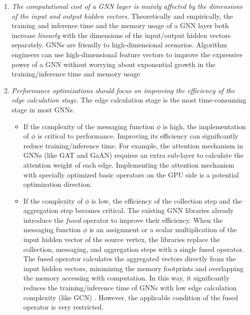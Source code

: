 \begin{enumerate}
    \item \emph{The computational cost of a GNN layer is mainly affected by the dimensions of the input and output hidden vectors.}
          Theoretically and empirically, the training and inference time and the memory usage of a GNN layer both increase \emph{linearly} with the dimensions of the input/output hidden vectors separately.
          GNNs are friendly to high-dimensional scenarios. 
          Algorithm engineers can use high-dimensional feature vectors to improve the expressive power of a GNN without worrying about exponential growth in the training/inference time and memory usage
    \item \emph{Performance optimizations should focus on improving the efficiency of the edge calculation stage.}
          The edge calculation stage is the most time-consuming stage in most GNNs.
          \begin{itemize}
              \item If the complexity of the messaging function $\phi$ is high, the implementation of $\phi$ is critical to performance.
                    Improving its efficiency can significantly reduce training/inference time.
                    For example, the attention mechanism in GNNs (like GAT and GaAN) requires an extra sub-layer to calculate the attention weight of each edge.
                    Implementing the attention mechanism with specially optimized basic operators on the GPU side is a potential optimization direction.
              \item If the complexity of $\phi$ is low, the efficiency of the collection step and the aggregation step becomes critical.
                    The existing GNN libraries \cite{DGL, PyG, ma2019_neugraph} already introduce the \emph{fused} operator to improve their efficiency.
                    When the messaging function $\phi$ is an assignment or a scalar multiplication of the input hidden vector of the source vertex, the libraries replace the collection, messaging, and aggregation steps with a single fused operator.
                    The fused operator calculates the aggregated vectors directly from the input hidden vectors, minimizing the memory footprints and overlapping the memory accessing with computation.
                    In this way, it significantly reduces the training/inference time of GNNs with low edge calculation complexity (like GCN) \cite{yan2020_characterizing_gcn, zhang2020_analysis_neugraph}.
                    However, the applicable condition of the fused operator is very restricted.

\end{itemize}
\end{enumerate}
